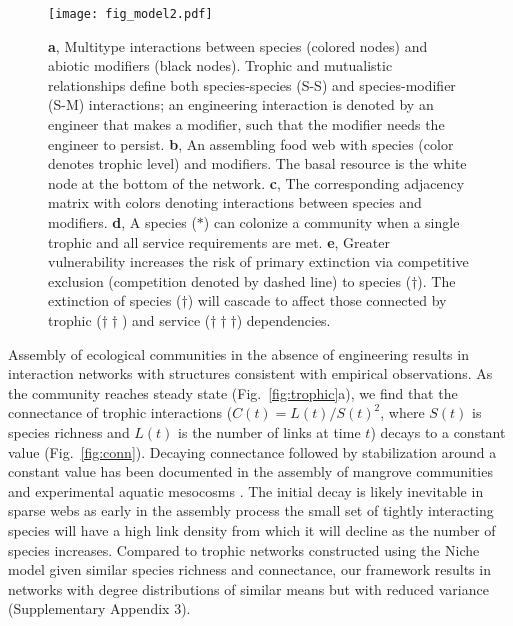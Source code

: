 \documentclass[twocolumn,preprintnumbers,amsmath,amssymb,superscriptaddress,linenumbers]{revtex4-1}
\begin{document}
\begin{bibunit}
\begin{figure}[h!]
\centering
\texttt{[image: fig\_model2.pdf]}
\vspace{0mm}
\caption{
\textbf{a}, Multitype interactions between species (colored nodes) and abiotic modifiers (black nodes).
Trophic and mutualistic relationships define both species-species (S-S) and species-modifier (S-M) interactions; an engineering interaction is denoted by an engineer that makes a modifier, such that the modifier needs the engineer to persist.
\textbf{b}, An assembling food web with species (color denotes trophic level) and modifiers. The basal resource is the white node at the bottom of the network.
\textbf{c}, The corresponding adjacency matrix with colors denoting interactions between species and modifiers.
\textbf{d}, A species ($\ast$) can colonize a community when a single trophic and all service requirements are met.
\textbf{e}, Greater vulnerability increases the risk of primary extinction via competitive exclusion (competition denoted by dashed line) to species ($\dag$).
The extinction of species ($\dag$) will cascade to affect those connected by trophic ($\dag \dag$) and service ($\dag \dag \dag$) dependencies. 
\vspace{-3mm}
}
\vspace{0mm}
\label{fig:model}
\end{figure}

Assembly of ecological communities in the absence of engineering results in interaction networks with structures consistent with empirical observations.
As the community reaches steady state (Fig.\ \ref{fig:trophic}a), we find that the connectance of trophic interactions ($C(t)=L(t)/S(t)^2$, where $S(t)$ is species richness and $L(t)$ is the number of links at time $t$) decays to a constant value (Fig.\ \ref{fig:conn}). %
Decaying connectance followed by stabilization around a constant value has been documented in the assembly of mangrove communities \cite{Piechnik2008} and experimental aquatic mesocosms \cite{Fahimipour2014}. 
The initial decay is likely inevitable in sparse webs as early in the assembly process the small set of tightly interacting species will have a high link density from which it will decline as the number of species increases.
Compared to trophic networks constructed using the Niche model \cite{Williams2000} given similar species richness and connectance, our framework results in networks with degree distributions of similar means but with reduced variance (Supplementary Appendix 3).


\end{bibunit}
\end{document}
